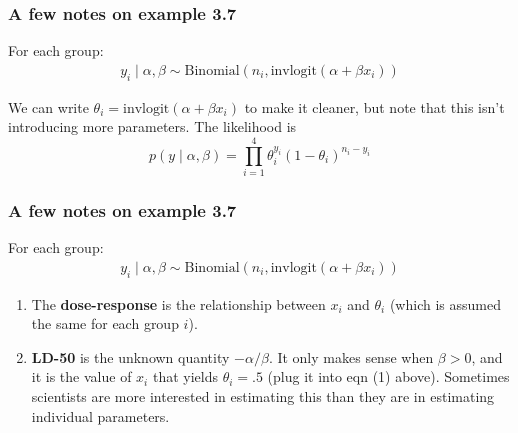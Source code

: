 \documentclass{beamer}
\begin{document}
\begin{frame}[fragile]
\frametitle{A few notes on example 3.7}

For each group:
\begin{gather*}
y_i \mid \alpha, \beta \sim \text{Binomial}(n_i, \text{invlogit}(\alpha + \beta x_i))
\end{gather*}

We can write $\theta_i = \text{invlogit}(\alpha + \beta x_i)$ to make it cleaner, but note that this isn't introducing more parameters. The likelihood is
$$
p(y \mid \alpha, \beta) = \prod_{i=1}^4 \theta_i^{y_i}(1-\theta_i)^{n_i-y_i}
$$


\end{frame}

\begin{frame}[fragile]
\frametitle{A few notes on example 3.7}

For each group:
\begin{gather}
y_i \mid \alpha, \beta \sim \text{Binomial}(n_i, \text{invlogit}(\alpha + \beta x_i))
\end{gather}


\begin{enumerate}
\item The {\bf dose-response} is the relationship between $x_i$ and $\theta_i$ (which is assumed the same for each group $i$).
\item {\bf LD-50} is the unknown quantity $-\alpha/\beta$. It only makes sense when $\beta > 0$, and it is the value of $x_i$ that yields $\theta_i = .5$ (plug it into eqn (1) above). Sometimes scientists are more interested in estimating this than they are in estimating individual parameters.
\end{enumerate}

\end{frame}
\end{document}
